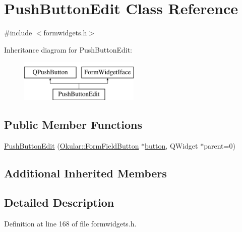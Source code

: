 \hypertarget{classPushButtonEdit}{\section{Push\+Button\+Edit Class Reference}
\label{classPushButtonEdit}
}


{\ttfamily \#include $<$formwidgets.\+h$>$}

Inheritance diagram for Push\+Button\+Edit\+:\begin{figure}[H]
\begin{center}
\leavevmode
\includegraphics[height=2.000000cm]{classPushButtonEdit}
\end{center}
\end{figure}
\subsection*{Public Member Functions}
\begin{DoxyCompactItemize}
\item 
\hyperlink{classPushButtonEdit_a427a32ef611ac0f96ad31146e5b2198f}{Push\+Button\+Edit} (\hyperlink{classOkular_1_1FormFieldButton}{Okular\+::\+Form\+Field\+Button} $\ast$\hyperlink{classFormWidgetIface_afd9eb69f17a3b1d5e970f3cc496ddb17}{button}, Q\+Widget $\ast$parent=0)
\end{DoxyCompactItemize}
\subsection*{Additional Inherited Members}


\subsection{Detailed Description}


Definition at line 168 of file formwidgets.\+h.



